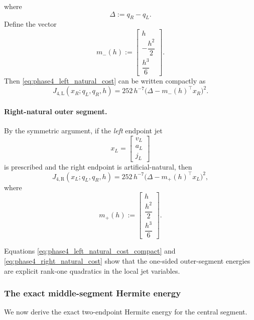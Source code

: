 where
\[
\Delta:=q_R-q_L.
\]
Define the vector
\begin{equation}
\label{eq:phase4_m_minus}
m_-(h):=
\begin{bmatrix}
h\\ -\dfrac{h^2}{2}\\ \dfrac{h^3}{6}
\end{bmatrix}.
\end{equation}
Then \eqref{eq:phase4_left_natural_cost} can be written compactly as
\begin{equation}
\label{eq:phase4_left_natural_cost_compact}
J_{4,\mathrm{L}}(x_R;q_L,q_R,h)
=
252\,h^{-7}\bigl(\Delta-m_-(h)^\top x_R\bigr)^2.
\end{equation}

\paragraph{Right-natural outer segment.}
By the symmetric argument, if the \emph{left} endpoint jet
\[
x_L=
\begin{bmatrix}
v_L\\ a_L\\ j_L
\end{bmatrix}
\]
is prescribed and the right endpoint is artificial-natural, then
\begin{equation}
\label{eq:phase4_right_natural_cost}
J_{4,\mathrm{R}}(x_L;q_L,q_R,h)
=
252\,h^{-7}\bigl(\Delta-m_+(h)^\top x_L\bigr)^2,
\end{equation}
where
\begin{equation}
\label{eq:phase4_m_plus}
m_+(h):=
\begin{bmatrix}
h\\ \dfrac{h^2}{2}\\ \dfrac{h^3}{6}
\end{bmatrix}.
\end{equation}

Equations \eqref{eq:phase4_left_natural_cost_compact} and \eqref{eq:phase4_right_natural_cost}
show that the one-sided outer-segment energies are explicit rank-one quadratics in the local jet variables.

\subsubsection{The exact middle-segment Hermite energy}
\label{subsubsec:phase4_middle_segment}

We now derive the exact two-endpoint Hermite energy for the central segment.

